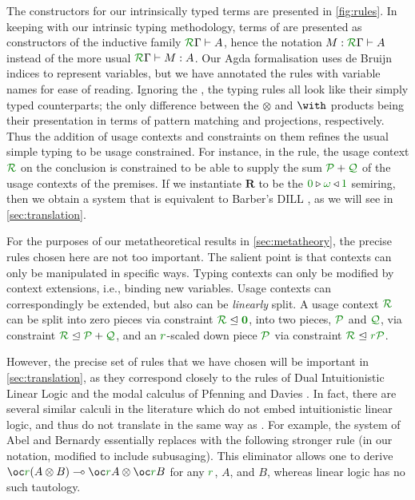 \documentclass[submission,copyright,creativecommons]{eptcs}
\begin{document}
The constructors for our intrinsically typed terms are presented in \autoref{fig:rules}.
In keeping with our intrinsic typing methodology, terms of \name{} are presented as constructors of the inductive family $\ctx\Gamma{R} \vdash A$, hence the notation $M : \ctx\Gamma{R} \vdash A$ instead of the more usual $\ctx\Gamma{R} \vdash M : A$. 
Our Agda formalisation uses de Bruijn indices to represent variables, but we have annotated the rules with variable names for ease of reading. 
Ignoring the , the typing rules all look like their
simply typed counterparts; the only difference between the $\otimes$
and $\with$ products being their presentation in terms of pattern
matching and projections, respectively.
Thus the addition of usage contexts and constraints on them refines the usual simple typing to be usage constrained.
For instance, in the  rule, the usage context $\resctx R$ on the conclusion is constrained to be able to supply the sum $\resctx P + \resctx Q$ of the usage contexts of the premises.
If we instantiate $\mathbf R$ to be the
$\zero \triangleright \unrestricted \triangleleft \linear$ semiring, then we
obtain a system that is equivalent to Barber's DILL \cite{Barber1996}, as we will see in \autoref{sec:translation}.

For the purposes of our metatheoretical results in \autoref{sec:metatheory}, the precise rules chosen here are
not too important.
The salient point is that contexts can only be manipulated in specific ways.
Typing contexts can only be modified by context extensions, i.e., binding new
variables.
Usage contexts can correspondingly be extended, but also can be
\emph{linearly} split.
A usage context $\resctx R$ can be split into zero pieces via constraint
$\resctx R \subres \rescomment{\vct 0}$, into two pieces, $\resctx P$ and
$\resctx Q$, via constraint $\resctx R \subres \resctx P + \resctx Q$, and an
$\rescomment r$-scaled down piece $\resctx P$ via constraint
$\resctx R \subres \rescomment r\resctx P$.

However, the precise set of rules that we have chosen will be important in \autoref{sec:translation}, as they
correspond closely to the rules of Dual Intuitionistic Linear Logic and the
modal calculus of Pfenning and Davies \cite{Barber1996,judgmental}.
In fact, there are several similar calculi in the literature which do not
embed intuitionistic linear logic, and thus do not translate in the same way as
\name{}.
For example, the system of Abel and Bernardy \cite{AbelBernardy2020}
essentially replaces  with the following stronger
rule (in our notation, modified to include subusaging).
This eliminator allows one to derive
$\fun{\excl r{(\tensor A B)}}{\tensor{\excl r A}{\excl r B}}$ for any
$\rescomment r$, $A$, and $B$, whereas linear logic has no such tautology.
\end{document}
